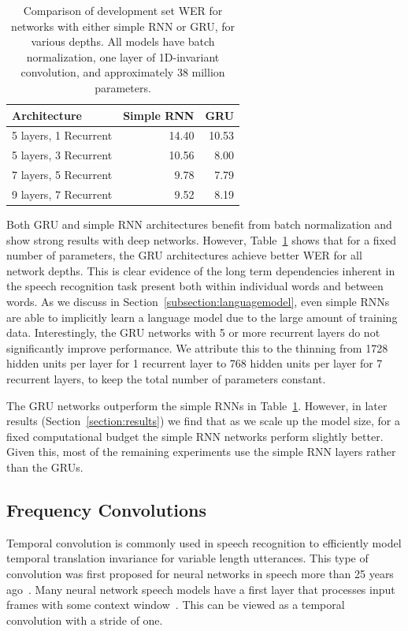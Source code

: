 \documentclass{article}
\begin{document}
\begin{table}
\centering
\begin{tabular}{l  r  r}
\toprule
Architecture &  Simple RNN & GRU \\
\midrule
5 layers, 1 Recurrent   & 14.40 & 10.53  \\
5 layers, 3 Recurrent   & 10.56 & 8.00  \\
7 layers, 5 Recurrent   & 9.78 & 7.79  \\
9 layers, 7 Recurrent   & 9.52 & 8.19  \\
\bottomrule
\end{tabular}
\caption{Comparison of development set WER for networks with either simple RNN or GRU, for various depths. All models have batch normalization, one layer of 1D-invariant convolution, and approximately 38 million parameters.}
\label{table:rnns}
\end{table}

Both GRU and simple RNN architectures benefit from batch normalization and show strong results with deep networks. However, Table~\ref{table:rnns} shows that for a fixed number of parameters, the GRU architectures achieve better WER for all network depths. This is clear evidence of the long term dependencies inherent in the speech recognition task present both within individual words and between words. As we discuss in Section~\ref{subsection:languagemodel}, even simple RNNs are able to implicitly learn a language model due to the large amount of training data. Interestingly, the GRU networks with 5 or more recurrent layers do not significantly improve performance. We attribute this to the thinning from 1728 hidden units per layer for 1 recurrent layer to 768 hidden units per layer for 7 recurrent layers, to keep the total number of parameters constant.

The GRU networks outperform the simple RNNs in Table~\ref{table:rnns}. However, in later results (Section~\ref{section:results}) we find that as we scale up the model size, for a fixed computational budget the simple RNN networks perform slightly better. Given this, most of the remaining experiments use the simple RNN layers rather than the GRUs.


\subsection{Frequency Convolutions}
\label{subsection:2dconv}

Temporal convolution is commonly used in speech recognition to efficiently model temporal translation invariance for variable length utterances. This type of convolution was first proposed for neural networks in speech more than 25 years ago~\cite{waibel1989}. Many neural network speech models have a first layer that processes input frames with some context window~\cite{dahl2011, vesely2013}. This can be viewed as a temporal convolution with a stride of one. 
\end{document}
